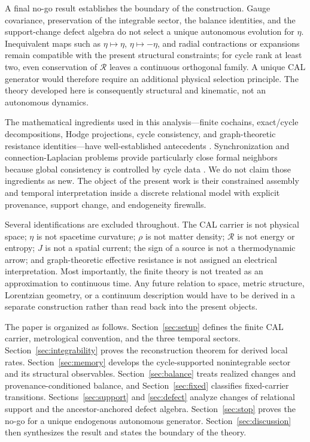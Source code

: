 A final no-go result establishes the boundary of the construction. Gauge covariance, preservation of the integrable sector, the balance identities, and the support-change defect algebra do not select a unique autonomous evolution for $\eta$. Inequivalent maps such as $\eta\mapsto\eta$, $\eta\mapsto-\eta$, and radial contractions or expansions remain compatible with the present structural constraints; for cycle rank at least two, even conservation of $\mathcal R$ leaves a continuous orthogonal family. A unique CAL generator would therefore require an additional physical selection principle. The theory developed here is consequently structural and kinematic, not an autonomous dynamics.

The mathematical ingredients used in this analysis---finite cochains, exact/cycle decompositions, Hodge projections, cycle consistency, and graph-theoretic resistance identities---have well-established antecedents \cite{Whitney1957,Desbrun2005DEC,Jiang2011HodgeRank,Lim2020HodgeLaplacians}. Synchronization and connection-Laplacian problems provide particularly close formal neighbors because global consistency is controlled by cycle data \cite{Singer2011Synchronization,Bandeira2013ConnectionLaplacian}. We do not claim those ingredients as new. The object of the present work is their constrained assembly and temporal interpretation inside a discrete relational model with explicit provenance, support change, and endogeneity firewalls.

Several identifications are excluded throughout. The CAL carrier is not physical space; $\eta$ is not spacetime curvature; $\rho$ is not matter density; $\mathcal R$ is not energy or entropy; $J$ is not a spatial current; the sign of a source is not a thermodynamic arrow; and graph-theoretic effective resistance is not assigned an electrical interpretation. Most importantly, the finite theory is not treated as an approximation to continuous time. Any future relation to space, metric structure, Lorentzian geometry, or a continuum description would have to be derived in a separate construction rather than read back into the present objects.

The paper is organized as follows. Section~\ref{sec:setup} defines the finite CAL carrier, metrological convention, and the three temporal sectors. Section~\ref{sec:integrability} proves the reconstruction theorem for derived local rates. Section~\ref{sec:memory} develops the cycle-supported nonintegrable sector and its structural observables. Section~\ref{sec:balance} treats realized changes and provenance-conditioned balance, and Section~\ref{sec:fixed} classifies fixed-carrier transitions. Sections~\ref{sec:support} and \ref{sec:defect} analyze changes of relational support and the ancestor-anchored defect algebra. Section~\ref{sec:stop} proves the no-go for a unique endogenous autonomous generator. Section~\ref{sec:discussion} then synthesizes the result and states the boundary of the theory.
